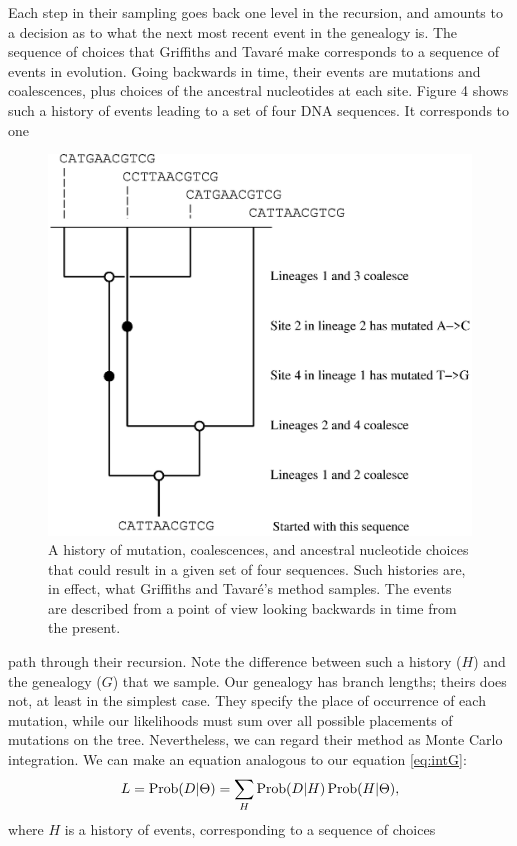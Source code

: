 Each step in their sampling goes back one level in the recursion, and
amounts to a decision as to what the next most recent event in the
genealogy is.  The sequence of choices that Griffiths and Tavar\'e make
corresponds to a sequence of events in evolution.  Going backwards in time,
their events are mutations and coalescences, plus choices of the
ancestral nucleotides at each site.  Figure 4 shows such a history
of events leading to a set of four DNA sequences.  It corresponds to one
\begin{figure} %
\centerline{\includegraphics[width=4.5in]{fig4.ps}}
\caption{A history of mutation, coalescences, and ancestral nucleotide choices
that could result in a given set of four sequences. Such histories
are, in effect, what Griffiths and Tavar\'e's method samples.  The
events are described from a point of view looking backwards in time from
the present.}
\end{figure}
path through their recursion.  Note the difference between such a history
($H$) and the genealogy ($G$) that we sample.  Our genealogy has branch
lengths; theirs does not, at least in the simplest case.  They specify
the place of occurrence of each mutation, while our likelihoods must sum
over all possible placements of mutations on the tree.  Nevertheless, we
can regard their method as Monte Carlo integration.  We can make an
equation analogous to our equation \ref{eq:intG}:
\begin{equation} %
L = \Prob(D|\Theta) = \sum_H \Prob(D|H) \Prob(H|\Theta),
\end{equation}
where $H$ is a history of events, corresponding to a sequence of choices
